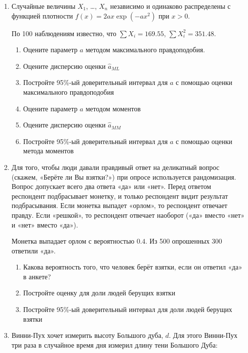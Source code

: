 \documentclass[12pt, a4paper]{article}\usepackage[]{graphicx}\usepackage[]{color}
\begin{document}
\begin{enumerate}

\item Случайные величины $X_1$, \ldots, $X_n$ независимо и одинаково распределены с функцией плотности $f(x)=2ax\exp(-ax^2)$ при $x>0$.



По 100 наблюдениям известно, что $\sum X_i = 169.55$, $\sum X_i^2 = 351.48$.

\begin{enumerate}
\item Оцените параметр $a$ методом максимального правдоподобия.
\item Оцените дисперсию оценки $\hat a_{ML}$
\item Постройте 95\%-ый доверительный интервал для $a$ с помощью оценки максимального правдоподобия
\item Оцените параметр $a$ методом моментов
\item Оцените дисперсию оценки $\hat a_{MM}$
\item Постройте 95\%-ый доверительный интервал для $a$ с помощью оценки метода моментов
\end{enumerate}

\item Для того, чтобы люди давали правдивый ответ на деликатный вопрос (скажем, «Берёте ли Вы взятки?») при опросе используется рандомизация. Вопрос допускает всего два ответа «да» или «нет». Перед ответом респондент подбрасывает монетку, и только респондент видит результат подбрасывания. Если монетка выпадет «орлом», то респондент отвечает правду. Если «решкой», то респондент отвечает наоборот («да» вместо «нет» и «нет» вместо «да»).

Монетка выпадает орлом с вероятностью $0.4$. Из 500 опрошенных 300 ответили «да».

\begin{enumerate}
\item Какова вероятность того, что человек берёт взятки, если он ответил «да» в анкете?
\item Постройте оценку для доли людей берущих взятки
\item Постройте 95\%-ый доверительный интервал для доли людей берущих взятки
\end{enumerate}

\item Винни-Пух хочет измерить высоту Большого дуба, $d$. Для этого Винни-Пух три раза в случайное время дня измерил длину тени Большого Дуба:


\end{enumerate}
\end{document}
